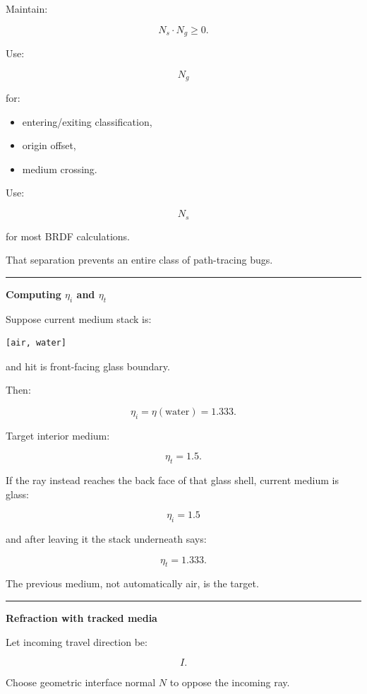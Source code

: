 Maintain:

\[
N_s\cdot N_g\ge0.
\]

Use:

\[
N_g
\]

for:

\begin{itemize}
\tightlist
\item
  entering/exiting classification,
\item
  origin offset,
\item
  medium crossing.
\end{itemize}

Use:

\[
N_s
\]

for most BRDF calculations.

That separation prevents an entire class of path-tracing bugs.

\begin{center}\rule{0.5\linewidth}{0.5pt}\end{center}

\textbf{Computing \(\eta_i\) and \(\eta_t\)}

Suppose current medium stack is:

\begin{verbatim}
[air, water]
\end{verbatim}

and hit is front-facing glass boundary.

Then:

\[
\eta_i=
\eta(\text{water})
=
1.333.
\]

Target interior medium:

\[
\eta_t=
1.5.
\]

If the ray instead reaches the back face of that glass shell, current medium is glass:

\[
\eta_i=1.5
\]

and after leaving it the stack underneath says:

\[
\eta_t=1.333.
\]

The previous medium, not automatically air, is the target.

\begin{center}\rule{0.5\linewidth}{0.5pt}\end{center}

\textbf{Refraction with tracked media}

Let incoming travel direction be:

\[
I.
\]

Choose geometric interface normal \(N\) to oppose the incoming ray.

